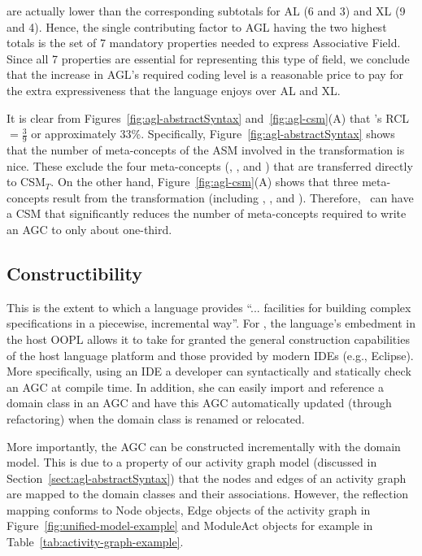 are actually lower than the corresponding subtotals for AL (6 and 3) and XL (9 and 4). Hence, the single contributing factor to AGL having the two highest totals is the set of 7 mandatory properties needed to express Associative Field. Since all 7 properties are essential for representing this type of field, we conclude that the increase in AGL’s required coding level is a reasonable price to pay for the extra expressiveness that the language enjoys over AL and XL.

It is clear from Figures~\ref{fig:agl-abstractSyntax} and~\ref{fig:agl-csm}(A) that \agl's RCL $ = \frac{3}{9}$ or approximately 33\%. Specifically, Figure~\ref{fig:agl-abstractSyntax} shows that the number of meta-concepts of the ASM involved in the transformation is nice. These exclude the four meta-concepts (, ,  and ) that are transferred directly to CSM$_T$. On the other hand, Figure~\ref{fig:agl-csm}(A) shows that three meta-concepts result from the transformation (including , , and ). Therefore, \agl~can have a CSM that significantly reduces the number of meta-concepts required to write an AGC to only about one-third. 
%
\subsection{Constructibility} \label{sect:eval-construct}
This is the extent to which a language provides ``... facilities for building complex specifications in a piecewise, incremental way''\cite{lamsweerde_formal_2000}. For \agl, the language's embedment in the host OOPL allows it to take for granted the general construction capabilities of the host language platform and those provided by modern IDEs (e.g., Eclipse). More specifically, using an IDE a developer can syntactically and statically check an AGC at compile time. In addition, she can easily import and reference a domain class in an AGC and have this AGC automatically updated (through refactoring) when the domain class is renamed or relocated.

More importantly, the AGC can be constructed incrementally with the domain model. This is due to a property of our activity graph model (discussed in Section~\ref{sect:agl-abstractSyntax}) that the nodes and edges of an activity graph are mapped to the domain classes and their associations.
%
However, the reflection mapping conforms to Node objects, Edge objects of the activity graph in Figure~\ref{fig:unified-model-example} and ModuleAct objects for example in Table~\ref{tab:activity-graph-example}.

